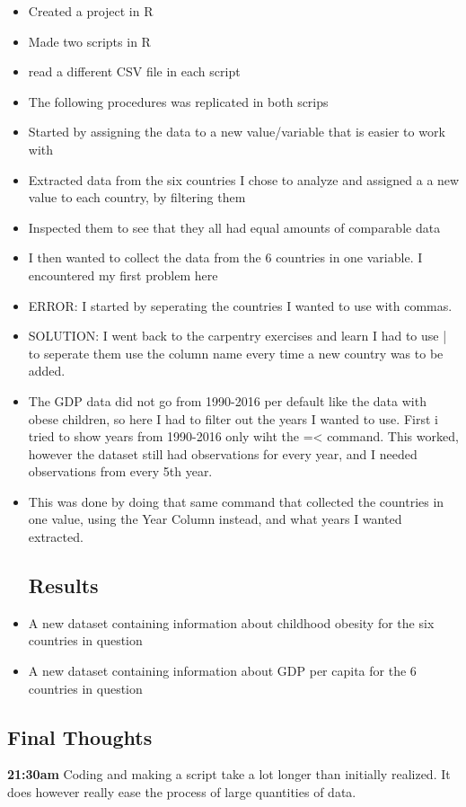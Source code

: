 \documentclass{article}
\begin{document}
\begin{itemize}
\item Created a project in R
\item Made two scripts in R
\item read a different CSV file in each script
\item The following procedures was replicated in both scrips
\item Started by assigning the data to a new value/variable that is easier to work with
\item Extracted data from the six countries I chose to analyze and assigned a a new value to each country, by filtering them
\item Inspected them to see that they all had equal amounts of comparable data
\item I then wanted to collect the data from the 6 countries in one variable. I encountered my first problem here
\item ERROR: I started by seperating the countries I wanted to use with commas.
\item SOLUTION: I went back to the carpentry exercises and learn I had to use | to seperate them use the column name every time a new country was to be added.
\item The GDP data did not go from 1990-2016 per default like the data with obese children, so here I had to filter out the years I wanted to use. First i tried to show years from 1990-2016 only wiht the =< command. This worked, however the dataset still had observations for every year, and I needed observations from every 5th year.
\item This was done by doing that same command that collected the countries in one value, using the Year Column instead, and what years I wanted extracted.

\subsection{Results}
\item A new dataset containing information about childhood obesity for the six countries in question
\item A new dataset containing information about GDP per capita for the 6 countries in question

\end{itemize}

\subsection{Final Thoughts}
\textbf{21:30am} Coding and making a script take a lot longer than initially realized. It does however really ease the process of large quantities of data.
\end{document}
